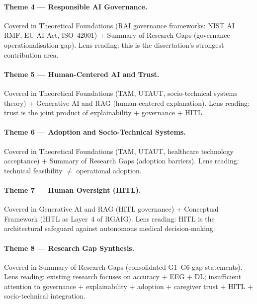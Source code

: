\paragraph{Theme 4 --- Responsible AI Governance.} Covered in Theoretical Foundations (RAI governance frameworks: NIST AI RMF, EU AI Act, ISO~42001) + Summary of Research Gaps (governance operationalisation gap). Lens reading: this is the dissertation's strongest contribution area.

\paragraph{Theme 5 --- Human-Centered AI and Trust.} Covered in Theoretical Foundations (TAM, UTAUT, socio-technical systems theory) + Generative AI and RAG (human-centered explanation). Lens reading: trust is the joint product of explainability + governance + HITL.

\paragraph{Theme 6 --- Adoption and Socio-Technical Systems.} Covered in Theoretical Foundations (TAM, UTAUT, healthcare technology acceptance) + Summary of Research Gaps (adoption barriers). Lens reading: technical feasibility $\neq$ operational adoption.

\paragraph{Theme 7 --- Human Oversight (HITL).} Covered in Generative AI and RAG (HITL governance) + Conceptual Framework (HITL as Layer~4 of RGAIG). Lens reading: HITL is the architectural safeguard against autonomous medical decision-making.

\paragraph{Theme 8 --- Research Gap Synthesis.} Covered in Summary of Research Gaps (consolidated G1--G6 gap statements). Lens reading: existing research focuses on accuracy + EEG + DL; insufficient attention to governance + explainability + adoption + caregiver trust + HITL + socio-technical integration.

